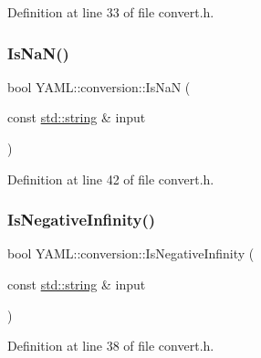 Definition at line 33 of file convert.\+h.

\mbox{\label{namespace_y_a_m_l_1_1conversion_a18c1203ebbec9aa7332b1c517e0986d3}} 
\subsubsection{\texorpdfstring{IsNaN()}{IsNaN()}}
{\footnotesize\ttfamily bool Y\+A\+M\+L\+::conversion\+::\+Is\+NaN (\begin{DoxyParamCaption}\item[{const \mbox{\hyperlink{glad_8h_ac83513893df92266f79a515488701770}{std\+::string}} \&}]{input }\end{DoxyParamCaption})\hspace{0.3cm}{\ttfamily [inline]}}



Definition at line 42 of file convert.\+h.

\mbox{\label{namespace_y_a_m_l_1_1conversion_aeee2784a85a229fc7792b257fd8f6087}} 
\subsubsection{\texorpdfstring{IsNegativeInfinity()}{IsNegativeInfinity()}}
{\footnotesize\ttfamily bool Y\+A\+M\+L\+::conversion\+::\+Is\+Negative\+Infinity (\begin{DoxyParamCaption}\item[{const \mbox{\hyperlink{glad_8h_ac83513893df92266f79a515488701770}{std\+::string}} \&}]{input }\end{DoxyParamCaption})\hspace{0.3cm}{\ttfamily [inline]}}



Definition at line 38 of file convert.\+h.

